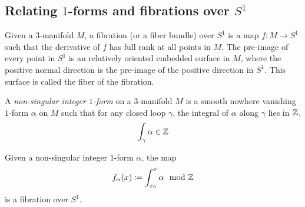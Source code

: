 \subsection{Relating $1$-forms and fibrations over $S^1$}
\label{sec:relating-1-forms}
  Given a $3$-manifold $M$, a fibration (or a fiber bundle) over $S^1$ is a map $f: M \to S^1$ such
  that the derivative of $f$ has full rank at all points in $M$. The pre-image of every point in
  $S^1$ is an relatively oriented embedded surface in $M$, where the positive normal direction is
  the pre-image of the positive direction in $S^1$. This surface is called the fiber of the
  fibration.


  A {\it non-singular integer $1$-form} on a $3$-manifold $M$ is a smooth nowhere vanishing $1$-form $\alpha$ on $M$
  such that for any closed loop $\gamma$, the integral of $\alpha$ along $\gamma$ lies in $\mathbb{Z}$.
  \begin{align*}
    \int_{\gamma} \alpha \in \mathbb{Z}
  \end{align*}

Given a non-singular integer $1$-form $\alpha$, the map
\begin{align*}
  f_{\alpha}(x) \coloneqq \int_{x_0}^x \alpha \mod {\mathbb{Z}}
\end{align*}
is a fibration over $S^1.$

